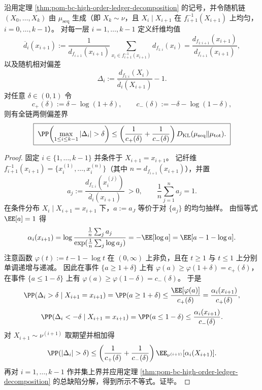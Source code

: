 \begin{theorem}\label{thm:pom-bc-chain-deviation-probability-bound}
沿用定理 \ref{thm:pom-bc-high-order-ledger-decomposition} 的记号，并令随机链 \((X_0,\dots,X_k)\) 由 \(\mu_{\mathrm{seq}}\) 生成（即 \(X_k\sim\nu\)，且 \(X_i\mid X_{i+1}\) 在 \(f_{i+1}^{-1}(X_{i+1})\) 上均匀，\(i=0,\dots,k-1\)）。
对每一层 \(i=1,\dots,k-1\) 定义纤维均值
\[
\overline d_i(x_{i+1})
:=
\frac1{d_{f_{i+1}}(x_{i+1})}\sum_{x_i\in f_{i+1}^{-1}(x_{i+1})} d_{f_{1:i}}(x_i)
=\frac{d_{f_{1:i+1}}(x_{i+1})}{d_{f_{i+1}}(x_{i+1})},
\]
以及随机相对偏差
\[
\Delta_i:=\frac{d_{f_{1:i}}(X_i)}{\overline d_i(X_{i+1})}-1.
\]
对任意 \(\delta\in(0,1)\) 令
\[
c_+(\delta):=\delta-\log(1+\delta),\qquad
c_-(\delta):=-\delta-\log(1-\delta),
\]
则有全链两侧偏差界
\[
\boxed{\;
\PP\!\left(\max_{1\le i\le k-1} |\Delta_i|>\delta\right)
\le
\left(\frac{1}{c_+(\delta)}+\frac{1}{c_-(\delta)}\right)
D_{\mathrm{KL}}(\mu_{\mathrm{seq}}\|\mu_{\mathrm{tot}}).
\;}
\]
\end{theorem}
\begin{proof}
固定 \(i\in\{1,\dots,k-1\}\) 并条件于 \(X_{i+1}=x_{i+1}\)。
记纤维 \(f_{i+1}^{-1}(x_{i+1})=\{x_i^{(1)},\dots,x_i^{(n)}\}\)（其中 \(n=d_{f_{i+1}}(x_{i+1})\)），并置
\[
a_j:=\frac{d_{f_{1:i}}(x_i^{(j)})}{\overline d_i(x_{i+1})}\ >0,
\qquad
\frac1n\sum_{j=1}^{n}a_j=1.
\]
在条件分布 \(X_i\mid X_{i+1}=x_{i+1}\) 下，\(a:=a_J\) 等价于对 \(\{a_j\}\) 的均匀抽样。
由恒等式 \(\EE[a]=1\) 得
\[
\alpha_i(x_{i+1})
=\log\frac{\frac1n\sum_j a_j}{\exp(\frac1n\sum_j\log a_j)}
=-\EE[\log a]
=\EE[a-1-\log a].
\]
注意函数 \(\varphi(t):=t-1-\log t\) 在 \((0,\infty)\) 上非负，且在 \(t\ge 1\) 与 \(t\le 1\) 上分别单调递增与递减。
因此在事件 \(\{a\ge 1+\delta\}\) 上有
\(
\varphi(a)\ge \varphi(1+\delta)=c_+(\delta)
\)，在事件 \(\{a\le 1-\delta\}\) 上有
\(
\varphi(a)\ge \varphi(1-\delta)=c_-(\delta)
\)。
于是
\[
\PP(\Delta_i>\delta\mid X_{i+1}=x_{i+1})
=\PP(a\ge 1+\delta)
\le \frac{\EE[\varphi(a)]}{c_+(\delta)}
=\frac{\alpha_i(x_{i+1})}{c_+(\delta)},
\]
\[
\PP(\Delta_i<-\delta\mid X_{i+1}=x_{i+1})
=\PP(a\le 1-\delta)
\le \frac{\alpha_i(x_{i+1})}{c_-(\delta)}.
\]
对 \(X_{i+1}\sim\nu^{(i+1)}\) 取期望并相加得
\[
\PP(|\Delta_i|>\delta)
\le
\left(\frac{1}{c_+(\delta)}+\frac{1}{c_-(\delta)}\right)\EE_{\nu^{(i+1)}}[\alpha_i(X_{i+1})].
\]
再对 \(i=1,\dots,k-1\) 作并集上界并应用定理 \ref{thm:pom-bc-high-order-ledger-decomposition} 的总缺陷分解，得到所示不等式。证毕。
\end{proof}


